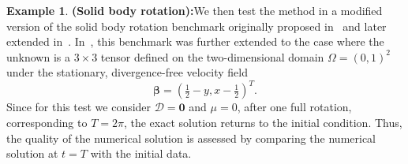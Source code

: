 \documentclass[final,12pt]{amsart}
\theoremstyle{plain}
\theoremstyle{definition}
\newtheorem{example}{Example}
\newcommand\bbeta{{\boldsymbol{\beta}}}
\begin{document}
\begin{example}{\bf (Solid body rotation):}\label{example2}
We then test the method in a modified version of the solid body rotation benchmark originally proposed in~\cite{zalesak1979fully} and later extended in~\cite{leveque1996high}.
In~\cite{lohmann2017flux}, this benchmark was further extended to the case where the unknown is a $3\times 3$ tensor defined on the two-dimensional domain
$\Omega = (0,1)^2$ under the stationary, divergence-free velocity field
\begin{equation}
	\bbeta = \left( \tfrac{1}{2} - y, x - \tfrac{1}{2} \right)^T.
\end{equation}
Since for this test we consider $\mathcal{D}=\mathbf{0}$ and $\mu=0$,
after one full rotation, corresponding to $T = 2\pi$, the exact solution returns to the initial condition. Thus, the quality of the numerical solution is
assessed by comparing the numerical solution at $t=T$ with the initial data.


\end{example}
\end{document}
